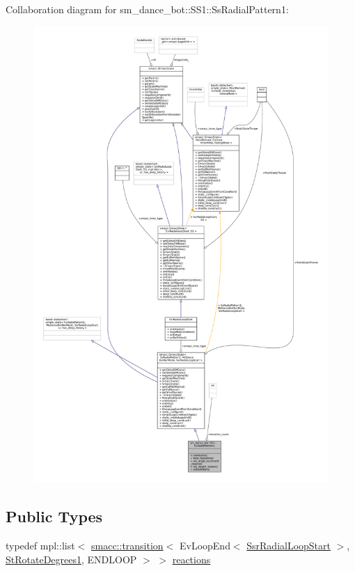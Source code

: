 Collaboration diagram for sm\+\_\+dance\+\_\+bot\+:\+:S\+S1\+:\+:Ss\+Radial\+Pattern1\+:
\nopagebreak
\begin{figure}[H]
\begin{center}
\leavevmode
\includegraphics[width=350pt]{structsm__dance__bot_1_1SS1_1_1SsRadialPattern1__coll__graph}
\end{center}
\end{figure}
\subsection*{Public Types}
\begin{DoxyCompactItemize}
\item 
typedef mpl\+::list$<$ \hyperlink{classsmacc_1_1transition}{smacc\+::transition}$<$ Ev\+Loop\+End$<$ \hyperlink{structSsrRadialLoopStart}{Ssr\+Radial\+Loop\+Start} $>$, \hyperlink{structsm__dance__bot_1_1StRotateDegrees1}{St\+Rotate\+Degrees1}, E\+N\+D\+L\+O\+OP $>$ $>$ \hyperlink{structsm__dance__bot_1_1SS1_1_1SsRadialPattern1_ae06982dbb8ef36e0535048974ef6b0ba}{reactions}
\end{DoxyCompactItemize}
